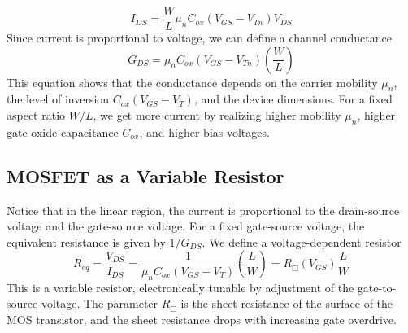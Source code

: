     \begin{equation}
        {I_{DS}} = \frac{W}{L}{\mu _n}{C_{ox}}({V_{GS}} - {V_{Tn}}){V_{DS}}
    \end{equation}
Since current is proportional to voltage, we can define a channel conductance
    \begin{equation}
        G_{DS} = {{{\mu _n}{C_{ox}}({V_{GS}} - {V_{Tn}})}}\left( {\frac{W}{L}} \right)
    \end{equation}
This equation shows that the conductance depends on the carrier mobility $\mu_n$, the level of inversion $C_{ox}(V_{GS}-V_T)$, and the device dimensions. For a fixed aspect ratio $W/L$, we get more current by realizing higher mobility $\mu_n$, higher gate-oxide capacitance $C_{ox}$, and higher bias voltages.  
\subsection{MOSFET as a Variable Resistor}
Notice that in the linear region, the current is proportional to the drain-source voltage and the gate-source voltage.  For a fixed gate-source voltage, the equivalent resistance is given by $1/G_{DS}$.  We define a voltage-dependent resistor
    \begin{equation}
        {R_{eq}} = \frac{{{V_{DS}}}}{{{I_{DS}}}} = \frac{1}{{{\mu _n}{C_{ox}}({V_{GS}} - {V_T})}}\left( {\frac{L}{W}} \right) = {R_\Box}({V_{GS}})\frac{L}{W}
    \end{equation}
This is a variable resistor, electronically tunable by adjustment of the gate-to-source voltage.  The parameter $R_\Box$ is the sheet resistance of the surface of the MOS transistor, and the sheet resistance drops with increasing gate overdrive.
